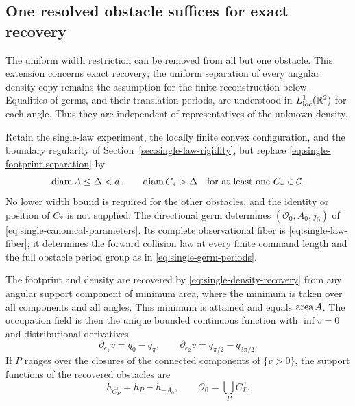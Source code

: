 \subsection{One resolved obstacle suffices for exact recovery}
\label{sec:single-resolved-extension}
The uniform width restriction can be removed from all but one
obstacle.  This extension concerns exact recovery; the uniform
separation of every angular density copy remains the assumption for
the finite reconstruction below.  Equalities of germs, and their
translation periods, are understood in $L^1_{\mathrm{loc}}(\mathbb R^2)$
for each angle.  Thus they are independent of representatives of
the unknown density.

\begin{theorem}
\label{thm:single-resolved-obstacle}
Retain the single-law experiment, the locally finite convex
configuration, and the boundary regularity of
Section~\ref{sec:single-law-rigidity}, but replace
\eqref{eq:single-footprint-separation} by
\begin{equation}\label{eq:single-one-body-separation}
 \operatorname{diam} A\le\Delta<d,\qquad
       \operatorname{diam} C_*>\Delta\quad\hbox{for at least one }C_*\in\mathcal C.
\end{equation}
No lower width bound is required for the other obstacles, and the
identity or position of $C_*$ is not supplied.  The directional
germ determines $(\mathcal O_0,A_0,j_0)$ of
\eqref{eq:single-canonical-parameters}.  Its complete observational
fiber is \eqref{eq:single-law-fiber}; it determines the forward
collision law at every finite command length and the full obstacle
period group as in \eqref{eq:single-germ-periods}.

The footprint and density are recovered by
\eqref{eq:single-density-recovery} from any angular support component
of minimum area, where the minimum is taken over all components and
all angles.  This minimum is attained and equals $\operatorname{area} A$.
The occupation field is then the unique bounded continuous function
with $\inf v=0$ and distributional derivatives
\begin{equation}\label{eq:single-odd-occupation}
 \partial_{e_1}v=q_0-q_\pi,
 \qquad \partial_{e_2}v=q_{\pi/2}-q_{3\pi/2}.
\end{equation}
If $P$ ranges over the closures of the connected components of
$\{v>0\}$, the support functions of the recovered obstacles are
\begin{equation}\label{eq:single-occupation-cancellation}
                 h_{C_P^0}=h_P-h_{-A_0},
 \qquad \mathcal O_0=\bigcup_P C_P^0.
\end{equation}
\end{theorem}
